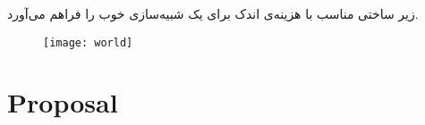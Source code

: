 \documentclass[11pt]{article}
\begin{document}
 زیر ساختی مناسب با هزینه‌ی اندک برای یک شبیه‌سازی خوب را فراهم می‌آورد.

\begin{figure}[h]
	\centering
	\texttt{[image: world]}
\end{figure}




\bigskip


\bigskip

%

\bigskip 

\section*{Proposal}

\bigskip

\end{document}
